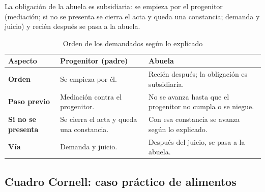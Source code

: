 \documentclass[12pt,oneside]{book}
\begin{document}

\begin{important}
La obligación de la abuela es subsidiaria: se empieza por el progenitor (mediación; si no se presenta se cierra el acta y queda una constancia; demanda y juicio) y recién después se pasa a la abuela.
\end{important}

\begin{table}[H]
\centering
\caption{Orden de los demandados según lo explicado}
\begin{tabularx}{\textwidth}{
    >{\raggedright\arraybackslash}p{}
    >{\raggedright\arraybackslash}X
    >{\raggedright\arraybackslash}X
}
\toprule
\textbf{Aspecto} & \textbf{Progenitor (padre)} & \textbf{Abuela} \\
\midrule
\textbf{Orden} &
Se empieza por él. &
Recién después; la obligación es subsidiaria. \\
\addlinespace
\textbf{Paso previo} &
Mediación contra el progenitor. &
No se avanza hasta que el progenitor no cumpla o se niegue. \\
\addlinespace
\textbf{Si no se presenta} &
Se cierra el acta y queda una constancia. &
Con esa constancia se avanza según lo explicado. \\
\addlinespace
\textbf{Vía} &
Demanda y juicio. &
Después del juicio, se pasa a la abuela. \\
\bottomrule
\end{tabularx}
\end{table}

\subsection*{Cuadro Cornell: caso práctico de alimentos}
\end{document}
